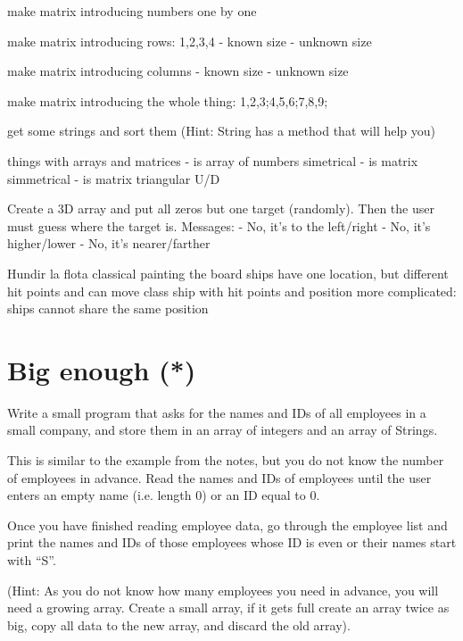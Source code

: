 



make matrix introducing numbers one by one

make matrix introducing rows: 1,2,3,4
  - known size
  - unknown size

make matrix introducing columns
  - known size
  - unknown size

make matrix introducing the whole thing: 1,2,3;4,5,6;7,8,9;




get some strings and sort them (Hint: String has a method that will
help you)



things with arrays and matrices
  - is array of numbers simetrical
  - is matrix simmetrical
  - is matrix triangular U/D

Create a 3D array and put all zeros but one target (randomly). Then the
user must guess where the target is. Messages:
  - No, it's to the left/right
  - No, it's higher/lower
  - No, it's nearer/farther

Hundir la flota
  classical
    painting the board
  ships have one location, but different hit points and can move
     class ship with hit points and position
     more complicated: ships cannot share the same position


\section{Big enough (*)}
\label{sec:big-enough}

Write a small program that asks for the names and IDs of all employees
in a small company, and store them in an array of integers and an
array of Strings. 

This is similar to the example from the notes, but you do not know the
number of employees in advance. Read the names and IDs of employees
until the user enters an empty name (i.e. length 0) or an ID equal to
0.

Once you have finished reading employee data, go through the employee
list and print the names and IDs of
those employees whose ID is even or their names start with ``S''. 

(Hint: As you do not know how many employees you need in advance, you
will need a growing array. Create a small array, if it gets full
create an array twice as big, copy all data to the new array, and
discard the old array).



